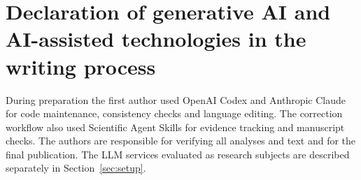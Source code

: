 \documentclass[11pt,a4paper]{article}
\begin{document}
\section*{Declaration of generative AI and AI-assisted technologies in the writing process}
During preparation the first author used OpenAI Codex and Anthropic Claude for code maintenance, consistency checks and language editing. The correction workflow also used Scientific Agent Skills \citep{kassis2026skills} for evidence tracking and manuscript checks. The authors are responsible for verifying all analyses and text and for the final publication. The LLM services evaluated as research subjects are described separately in Section~\ref{sec:setup}.

\FloatBarrier
\begingroup\small
\setlength{\bibsep}{2pt}


\endgroup

\end{document}
